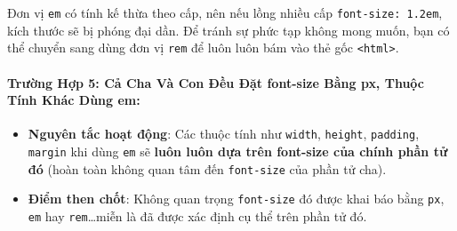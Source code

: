 \documentclass[11pt,oneside]{book}
\newcommand{\thd}[1]{\textcolor{white}{\textbf{\strut #1}}}
\newcommand{\codeinline}[1]{\textcolor{accentOrange}{\texttt{#1}}}
\begin{document}
\begin{prettyTableBox}
\sffamily\small
{}
\end{prettyTableBox}

\begin{prettyTableBox}
\sffamily\small
{}
\end{prettyTableBox}

\begin{warnBox}
Đơn vị \codeinline{em} có tính kế thừa theo cấp, nên nếu lồng nhiều cấp \codeinline{font-size: 1.2em}, kích thước sẽ bị phóng đại dần. Để tránh sự phức tạp không mong muốn, bạn có thể chuyển sang dùng đơn vị \codeinline{rem} để luôn luôn bám vào thẻ gốc \codeinline{<html>}.
\end{warnBox}

\paragraph{Trường Hợp 5: Cả Cha Và Con Đều Đặt font-size Bằng px, Thuộc Tính Khác Dùng em:}
\begin{itemize}[leftmargin=1.5em, itemsep=2pt, parsep=0pt]
    \item \textbf{Nguyên tắc hoạt động}: Các thuộc tính như \codeinline{width}, \codeinline{height}, \codeinline{padding}, \codeinline{margin} khi dùng \codeinline{em} sẽ \textbf{luôn luôn dựa trên font-size của chính phần tử đó} (hoàn toàn không quan tâm đến \codeinline{font-size} của phần tử cha).
    \item \textbf{Điểm then chốt}: Không quan trọng \codeinline{font-size} đó được khai báo bằng \codeinline{px}, \codeinline{em} hay \codeinline{rem}\dots miễn là đã được xác định cụ thể trên phần tử đó.
\end{itemize}
\end{document}
